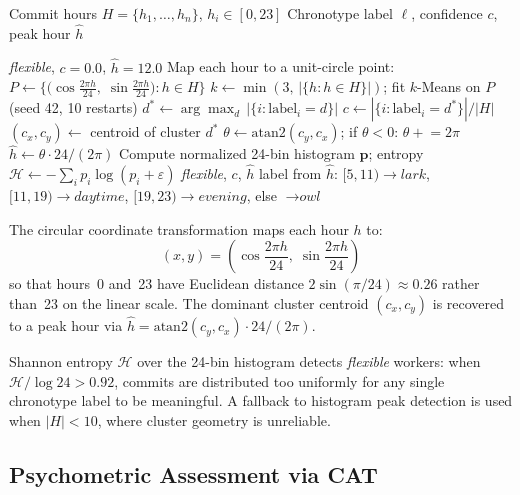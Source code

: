 \documentclass[conference]{IEEEtran}
\begin{document}
\begin{algorithm}[t]
\caption{Circular K-Means Chronotype Classification}
\label{alg:chrono}
\begin{algorithmic}[1]
\REQUIRE Commit hours $H = \{h_1, \ldots, h_n\}$, $h_i \in [0,23]$
\ENSURE Chronotype label $\ell$, confidence $c$, peak hour $\hat{h}$

  \RETURN \textit{flexible}, $c{=}0.0$, $\hat{h}{=}12.0$
\ENDIF
\STATE Map each hour to a unit-circle point:
  $P \leftarrow \bigl\{\bigl(\cos\tfrac{2\pi h}{24},\;
    \sin\tfrac{2\pi h}{24}\bigr) : h \in H\bigr\}$
\STATE $k \leftarrow \min(3,\, |\{h : h \in H\}|)$;
  fit $k$-Means on $P$ (seed 42, 10 restarts)
\STATE $d^* \leftarrow \arg\max_d \,|\{i : \text{label}_i = d\}|$
\STATE $c \leftarrow |\{i : \text{label}_i = d^*\}| / |H|$
\STATE $(c_x, c_y) \leftarrow$ centroid of cluster $d^*$
\STATE $\theta \leftarrow \mathrm{atan2}(c_y, c_x)$;\;
  if $\theta < 0$: $\theta \mathrel{+}= 2\pi$
\STATE $\hat{h} \leftarrow \theta \cdot 24 / (2\pi)$
\STATE Compute normalized 24-bin histogram $\mathbf{p}$;
  entropy $\mathcal{H} \leftarrow -\sum_{i} p_i \log(p_i + \varepsilon)$
  \RETURN \textit{flexible}, $c$, $\hat{h}$
\ENDIF
\RETURN label from $\hat{h}$:
  $[5,11) \to \textit{lark}$,\;
  $[11,19) \to \textit{daytime}$,\;
  $[19,23) \to \textit{evening}$,\;
  else $\to \textit{owl}$
\end{algorithmic}
\end{algorithm}

The circular coordinate transformation maps each hour $h$ to:
\begin{equation}
  (x, y) = \left(\cos\!\frac{2\pi h}{24},\; \sin\!\frac{2\pi h}{24}\right)
  \label{eq:circ}
\end{equation}
so that hours~0 and~23 have Euclidean distance
$2\sin(\pi/24) \approx 0.26$ rather than~23 on the linear scale.
The dominant cluster centroid $(c_x, c_y)$ is recovered to a peak
hour via $\hat{h} = \mathrm{atan2}(c_y, c_x) \cdot 24 / (2\pi)$.

Shannon entropy $\mathcal{H}$ over the 24-bin histogram detects
\textit{flexible} workers: when $\mathcal{H}/\log 24 > 0.92$,
commits are distributed too uniformly for any single chronotype
label to be meaningful.  A fallback to histogram peak detection
is used when $|H| < 10$, where cluster geometry is unreliable.

\subsection{Psychometric Assessment via CAT}
\end{document}
